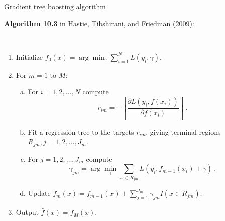 \documentclass[
  10pt,
  ignorenonframetext,
]{beamer}
\providecommand{\tightlist}{%
  \setlength{\itemsep}{0pt}\setlength{\parskip}{0pt}}
\begin{document}
\begin{frame}
\begin{block}{Gradient tree boosting algorithm}
\protect\hypertarget{gradient-tree-boosting-algorithm}{}
\(~\)

\textbf{Algorithm 10.3} in Hastie, Tibshirani, and Friedman (2009):

\(~\)

\begin{enumerate}
\tightlist
\item
  Initialize \(f_0(x) = \arg \min_\gamma \sum_{i=1}^N L(y_i,\gamma)\).
\end{enumerate}

\vspace{1mm}

\begin{enumerate}
\setcounter{enumi}{1}
\item
  For \(m=1\) to \(M\):

  \begin{enumerate}
  [(a)]
  \tightlist
  \item
    For \(i=1,2,\ldots, N\) compute
    \[r_{im} = - \left[ \frac{\partial L(y_i,f(x_i))}{\partial f(x_i)} \right] \ .\]
  \item
    Fit a regression tree to the targets \(r_{im}\), giving terminal
    regions \(R_{jm}, j=1,2,\ldots , J_m\).
  \end{enumerate}

  \vspace{1mm}

  \begin{enumerate}
  [(a)]
  \setcounter{enumii}{2}
  \item
    For \(j=1,2,\ldots, J_m\) compute
    \[\gamma_{jm} = \arg \min_\gamma \sum_{x_i \in R_{jm}} L(y_i, f_{m-1}(x_i) + \gamma) \ .\]
    \vspace{1mm}
  \item
    Update
    \(f_m(x)=f_{m-1}(x) + \sum_{j=1}^{J_m} \gamma_{jm}I(x\in R_{jm})\).
  \end{enumerate}
\end{enumerate}

\vspace{1mm}

\begin{enumerate}
\setcounter{enumi}{2}
\tightlist
\item
  Output \(\hat{f}(x)=f_M(x)\).
\end{enumerate}
\end{block}
\end{frame}
\end{document}
